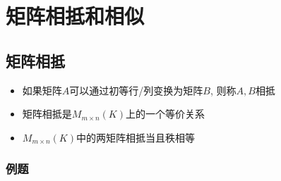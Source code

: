 \chapter{矩阵相抵和相似}

\section{矩阵相抵}
\begin{itemize}
\item 如果矩阵$A$可以通过初等行/列变换为矩阵$B$, 则称$A,B$相抵
\item 矩阵相抵是$M_{m\times n}(K)$上的一个等价关系
\item $M_{m\times n}(K)$中的两矩阵相抵当且秩相等
\end{itemize}

\subsection*{例题}
